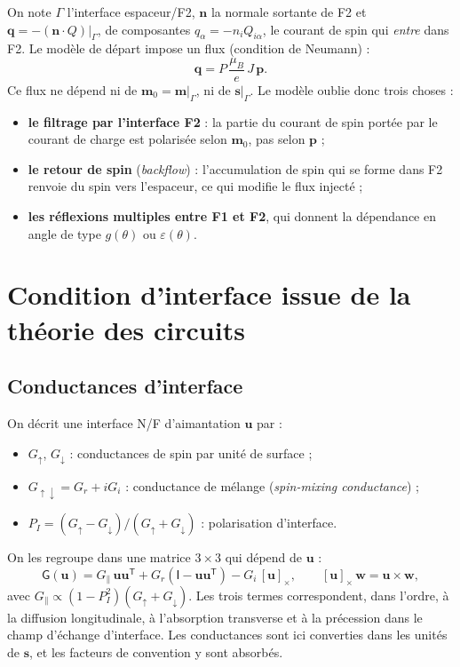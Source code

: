 \documentclass[11pt,a4paper]{article}
\newcommand{\vm}{\bm{m}}
\newcommand{\vp}{\bm{p}}
\newcommand{\vs}{\bm{s}}
\newcommand{\vq}{\bm{q}}
\newcommand{\mG}{\mathsf{G}}
\newcommand{\Id}{\mathsf{I}}
\begin{document}
On note $\Gamma$ l'interface espaceur/F2, $\bm{n}$ la normale sortante de
F2 et $\vq = -(\bm{n}\cdot Q)|_\Gamma$, de composantes $q_\alpha = -n_iQ_{i\alpha}$,
le courant de spin qui
\emph{entre} dans F2. Le modèle de départ impose un flux (condition de
Neumann) :
\begin{equation}
  \vq = P\,\frac{\mu_B}{e}\,J\,\vp.
  \label{eq:neumann}
\end{equation}
Ce flux ne dépend ni de $\vm_0 = \vm|_\Gamma$, ni de $\vs|_\Gamma$. Le
modèle oublie donc trois choses :
\begin{itemize}
  \item \textbf{le filtrage par l'interface F2} : la partie du courant de
    spin portée par le courant de charge est polarisée selon $\vm_0$, pas
    selon $\vp$ ;
  \item \textbf{le retour de spin} (\emph{backflow}) : l'accumulation de
    spin qui se forme dans F2 renvoie du spin vers l'espaceur, ce qui
    modifie le flux injecté ;
  \item \textbf{les réflexions multiples entre F1 et F2}, qui donnent la
    dépendance en angle de type $g(\theta)$ ou $\varepsilon(\theta)$.
\end{itemize}

\section{Condition d'interface issue de la théorie des circuits}

\subsection{Conductances d'interface}

On décrit une interface N/F d'aimantation $\bm{u}$ par :
\begin{itemize}
  \item $G_\uparrow$, $G_\downarrow$ : conductances de spin par unité de surface ;
  \item $G_{\uparrow\downarrow} = G_r + iG_i$ : conductance de mélange
    (\emph{spin-mixing conductance}) ;
  \item $P_I = (G_\uparrow-G_\downarrow)/(G_\uparrow+G_\downarrow)$ :
    polarisation d'interface.
\end{itemize}
On les regroupe dans une matrice $3\times3$ qui dépend de $\bm{u}$ :
\begin{equation}
  \mG(\bm{u}) = G_\parallel\,\bm{u}\bm{u}^{\mathsf{T}}
  + G_r\left(\Id-\bm{u}\bm{u}^{\mathsf{T}}\right)
  - G_i\,[\bm{u}]_\times,
  \qquad [\bm{u}]_\times\,\bm{w} = \bm{u}\times\bm{w},
  \label{eq:G}
\end{equation}
avec $G_\parallel\propto(1-P_I^2)(G_\uparrow+G_\downarrow)$. Les trois
termes correspondent, dans l'ordre, à la diffusion longitudinale, à
l'absorption transverse et à la précession dans le champ d'échange
d'interface. Les conductances sont ici converties dans les unités de $\vs$,
et les facteurs de convention y sont absorbés.
\end{document}
